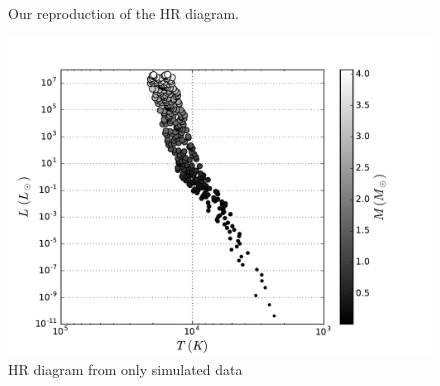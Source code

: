 \documentclass[10pt]{article}
\begin{document}
\begin{figure}[p]
\begin{centering}

\caption{Our reproduction of the HR diagram.}
\label{fig:HR}
\end{centering}
\end{figure}

\begin{figure}[p]
\begin{centering}
\includegraphics[width=\textwidth]{extra_hr.pdf}
\caption{HR diagram from only simulated data}
\label{fig:extraHR}
\end{centering}
\end{figure}
\end{document}
